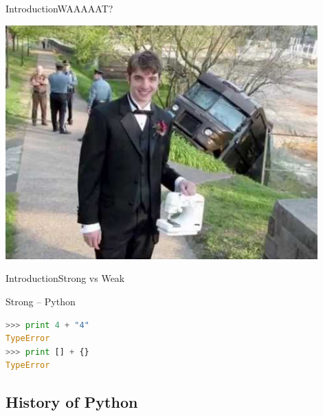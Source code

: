 \documentclass[10pt]{beamer}
\begin{document}
\begin{frame}{Introduction}{WAAAAAT?}
	\begin{center}
		\includegraphics[width=0.9\textwidth]{pictures/wat.jpg}
	\end{center}
\end{frame}


\begin{frame}[fragile]{Introduction}{Strong vs Weak}
	
\begin{center}
		
\begin{block}{Strong -- Python}
\begin{lstlisting}[language=Python]
>>> print 4 + "4"
TypeError
>>> print [] + {}
TypeError
\end{lstlisting}
\end{block}
		
\end{center}
	
\end{frame}

\subsection{History of Python}
\end{document}
